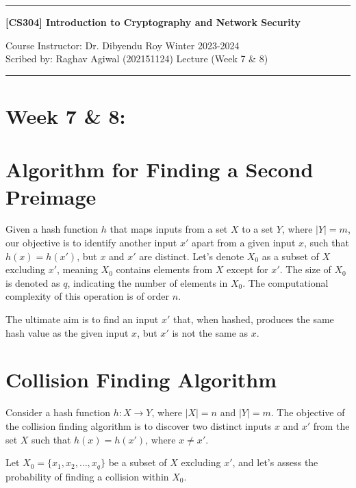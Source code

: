 \documentclass[11pt]{article}
\begin{document}
\noindent
\rule{\textwidth}{1pt}
\begin{center}
{\bf [CS304] Introduction to Cryptography and Network Security}
\end{center}
Course Instructor: Dr. Dibyendu Roy \hfill Winter 2023-2024\\
Scribed by: Raghav Agiwal (202151124) \hfill Lecture (Week 7 \& 8)
\\
\rule{\textwidth}{1pt}

\section*{Week 7 \& 8:}
\section*{Algorithm for Finding a Second Preimage}


Given a hash function \( h \) that maps inputs from a set \( X \) to a set \( Y \), where \( |Y| = m \), our objective is to identify another input \( x' \) apart from a given input \( x \), such that \( h(x) = h(x') \), but \( x \) and \( x' \) are distinct. Let's denote \( X_0 \) as a subset of \( X \) excluding \( x' \), meaning \( X_0 \) contains elements from \( X \) except for \( x' \). The size of \( X_0 \) is denoted as \( q \), indicating the number of elements in \( X_0 \). The computational complexity of this operation is of order \( n \).

The ultimate aim is to find an input \( x' \) that, when hashed, produces the same hash value as the given input \( x \), but \( x' \) is not the same as \( x \).

\section*{Collision Finding Algorithm}

Consider a hash function \( h : X \rightarrow Y \), where \( |X| = n \) and \( |Y| = m \). The objective of the collision finding algorithm is to discover two distinct inputs \( x \) and \( x' \) from the set \( X \) such that \( h(x) = h(x') \), where \( x \neq x' \).

Let \( X_0 = \{x_1, x_2, \ldots, x_q\} \) be a subset of \( X \) excluding \( x' \), and let's assess the probability of finding a collision within \( X_0 \).
\end{document}
